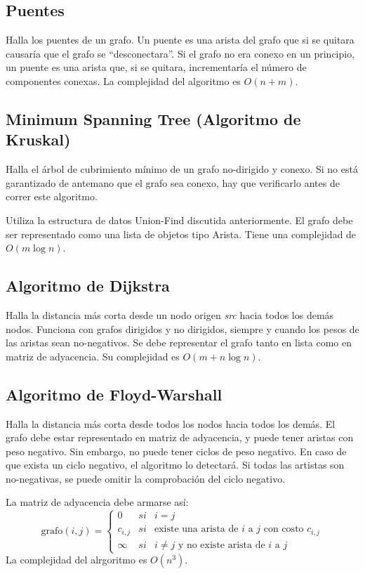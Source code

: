 \documentclass{article}
\begin{document}
\begin{multicols}{2}
	\subsection{Puentes}
	Halla los puentes de un grafo.  Un puente es una arista del grafo que si se quitara causaría que el grafo se ``desconectara''. Si el grafo no era conexo en un principio, un puente es una arista que, si se quitara, incrementaría el número de componentes conexas. La complejidad del algoritmo es \( O(n + m) \).
	
	
	\subsection{Minimum Spanning Tree (Algoritmo de Kruskal)}
	Halla el árbol de cubrimiento mínimo de un grafo no-dirigido y conexo. Si no está garantizado de antemano que el grafo sea conexo, hay que verificarlo antes de correr este algoritmo. 
		
	Utiliza la estructura de datos Union-Find discutida anteriormente. El grafo debe ser representado como una lista de objetos tipo Arista. Tiene una complejidad de \( O( m \log n) \).	
	
	
	\subsection{Algoritmo de Dijkstra}
	Halla la distancia más corta desde un nodo origen \emph{src} hacia todos los demás nodos. Funciona con grafos dirigidos y no dirigidos, siempre y cuando los pesos de las aristas sean no-negativos. Se debe representar el grafo tanto en lista como en matriz de adyacencia. Su complejidad es \( O(m + n \log n) \).
	
	
	\subsection{Algoritmo de Floyd-Warshall}
	Halla la distancia más corta desde todos los nodos hacia todos los demás. El grafo debe estar representado en matriz de adyacencia, y puede tener aristas con peso negativo. Sin embargo, no puede tener ciclos de peso negativo. En caso de que exista un ciclo negativo, el algoritmo lo detectará. Si todas las artistas son no-negativas, se puede omitir la comprobación del ciclo negativo.
	
	La matriz de adyacencia debe armarse así:
	\[
		\text{grafo}(i, j) = \left \{ 
			\begin{array}{lcc}
				0 & si & i = j
				\\ c_{i,j} & si & \text{existe una arista de } i \text{ a } j \text{ con costo } c_{i,j}
				\\ \infty & si & i \neq j \text{ y no existe arista de } i \text{ a } j 
			\end{array}
		\right.
	\]
	La complejidad del alrgoritmo es \( O(n^3) \).
	


\end{multicols}
\end{document}
